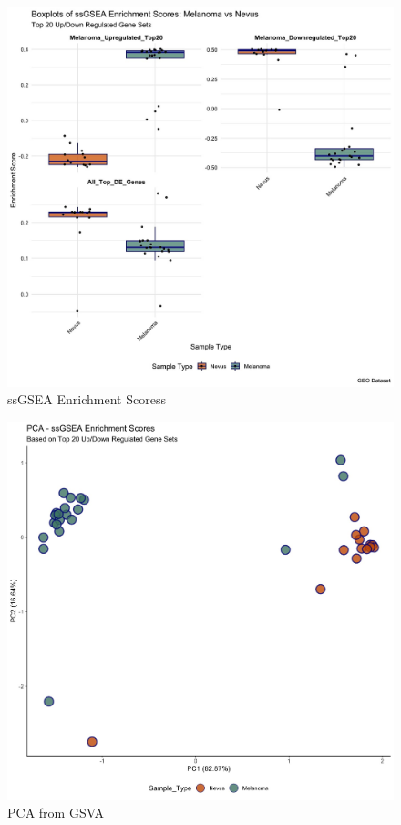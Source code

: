 \documentclass[
]{article}
\begin{document}
\begin{figure}

{\centering \includegraphics[width=0.8\linewidth]{Images/Boxplots of ssGSEA} 

}

\caption{ssGSEA Enrichment Scoress}\label{fig:unnamed-chunk-32}
\end{figure}

\begin{figure}

{\centering \includegraphics[width=0.9\linewidth]{Images/ssGSEA_PCA} 

}

\caption{PCA from GSVA}\label{fig:unnamed-chunk-33}
\end{figure}
\end{document}
